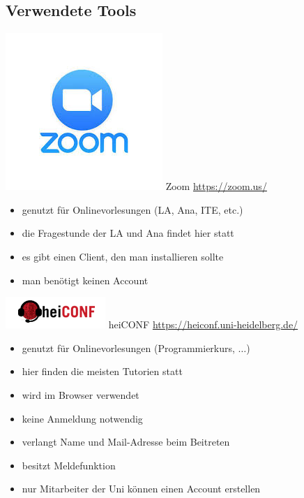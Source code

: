 \subsection{Verwendete Tools}
\begin{frame}{\includegraphics[scale=0.092]{images/zoom.jpg} Zoom}
	\url{https://zoom.us/}
	\begin{itemize}
		\item genutzt für Onlinevorlesungen (LA, Ana, ITE, etc.)
		\item die Fragestunde der LA und Ana findet hier statt
		\item es gibt einen Client, den man installieren sollte
		\item man benötigt keinen Account
	\end{itemize}
	
\end{frame}

\begin{frame}{\includegraphics[scale=0.42]{images/heiConf.png} heiCONF}
	\url{https://heiconf.uni-heidelberg.de/}
	\begin{itemize}
		\item genutzt für Onlinevorlesungen (Programmierkurs, $\dots$)
		\item hier finden die meisten Tutorien statt
		\item wird im Browser verwendet
		\item keine Anmeldung notwendig
		\item verlangt Name und Mail-Adresse beim Beitreten
		\item besitzt Meldefunktion
		\item nur Mitarbeiter der Uni können einen Account erstellen
	\end{itemize}
	
\end{frame}

